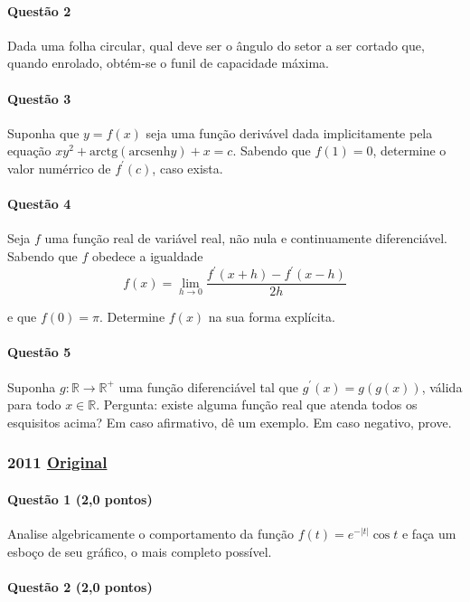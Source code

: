\documentclass[12pt,a4paper]{article}
\newcommand{\R}{\mathbb{R}}
\newcommand{\modu}[1]{\vert #1 \vert}
\newcommand{\original}[1]{\tiny \href{#1}{Original} \normalsize}
\begin{document}
\paragraph{Questão 2}
Dada uma folha circular, qual deve ser o ângulo do setor a ser cortado que, quando enrolado, obtém-se o funil de capacidade máxima.

\paragraph{Questão 3}
Suponha que $y=f(x)$ seja uma função derivável dada implicitamente pela equação $xy^2 + \mathrm{arctg}(\mathrm{arcsenh}y) + x = c$. Sabendo que $f(1) = 0$, determine o valor numérrico de $f^{\prime}(c)$, caso exista.

\paragraph{Questão 4}
Seja $f$ uma função real de variável real, não nula e continuamente diferenciável. Sabendo que $f$ obedece a igualdade $$f(x) = \lim\limits_{h\to 0}\dfrac{f^{\prime}(x+h) - f^{\prime}(x-h)}{2h}$$

e que $f(0)=\pi$. Determine $f(x)$ na sua forma explícita.

\paragraph{Questão 5}
Suponha $g: \R \to \R^+$ uma função diferenciável tal que $g^{\prime}(x) = g(g(x))$, válida para todo $x \in \R$.
Pergunta: existe alguma função real que atenda todos os esquisitos acima? Em caso afirmativo, dê um exemplo. Em caso negativo, prove.

\newpage

\subsubsection{2011 \original{https://drive.google.com/open?id=1vnhOh0HXSND4CspT8ZsXAwfaBkc_133y}}

\paragraph{Questão 1 (2,0 pontos)}

Analise algebricamente o comportamento da função $f(t) = e^{-\modu{t}}\cos t$ e faça um esboço de seu gráfico, o mais completo possível.

\paragraph{Questão 2 (2,0 pontos)}
\end{document}
